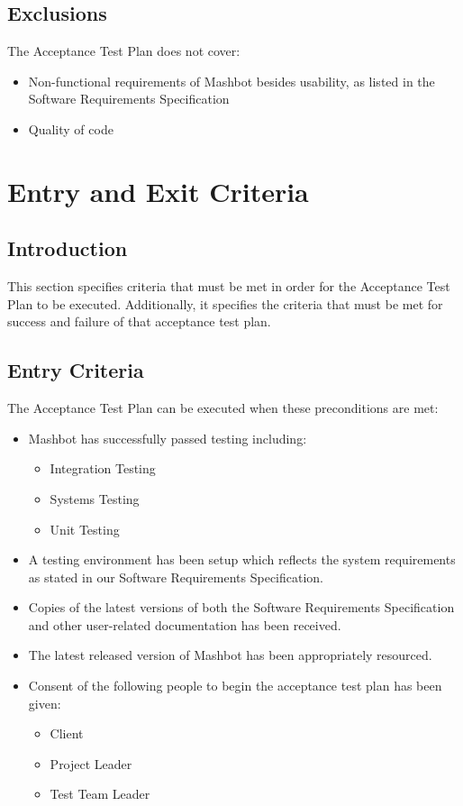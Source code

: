 \documentclass{article}
\begin{document}
\subsection{Exclusions}

The Acceptance Test Plan does not cover:

\begin{itemize}
\item Non-functional requirements of Mashbot besides usability, as listed in
the Software Requirements Specification
\item Quality of code
\end{itemize}

\section{Entry and Exit Criteria} %


\subsection{Introduction}
	This section specifies criteria that must be met in order for the Acceptance 
	Test Plan to be executed. Additionally, it specifies the criteria that must 
	be met for success and failure of that acceptance test plan.
\subsection{Entry Criteria}
	The Acceptance Test Plan can be executed when these preconditions are met:
	\begin{itemize}
		\item Mashbot has successfully passed testing including:
			\begin{itemize}
				\item Integration Testing
				\item Systems Testing
				\item Unit Testing
			\end{itemize}
		\item A testing environment has been setup which reflects the system 
		requirements as stated in our Software Requirements Specification.
		\item Copies of the latest versions of both the Software Requirements 
		Specification and other user-related documentation has been received.
		\item The latest released version of Mashbot has been appropriately 
		resourced.
		\item Consent of the following people to begin the acceptance test plan 
		has been given:
			\begin{itemize}
				\item Client
				\item Project Leader
				\item Test Team Leader
			\end{itemize}
	\end{itemize}
\end{document}
